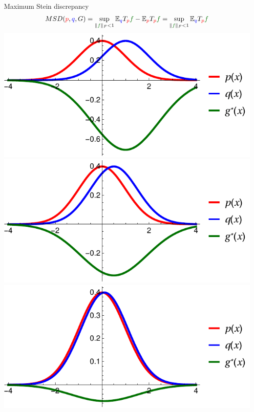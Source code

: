 \begin{frame}
\begin{columns}
\begin{column}{.33\linewidth}
\begin{block}{Maximum Stein discrepancy}
\large
\begin{align*}
MSD({\color{red} p},{ \color{blue} q},G) = \sup_{   \| {\color{mg} f} \|_F<1} \ev_{{ \color{blue} q}} T_{\color{red} p} {\color{mg} f} - \ev_{{\color{red} p}} T_{\color{red} p} {\color{mg} f}  = \sup_{ \| {\color{mg} f} \|_F<1} \ev_{{ \color{blue} q}} T_{\color{red} p} {\color{mg} f} 
\end{align*}
\vspace{2cm}
\centering
\includegraphics[scale=1.2]{../../presentation/img/s1.pdf}
\includegraphics[scale=1.2]{../../presentation/img/s05.pdf}\\
\includegraphics[scale=1.2]{../../presentation/img/s01.pdf}

\end{block}
\end{column}
\end{columns}
\end{frame}
